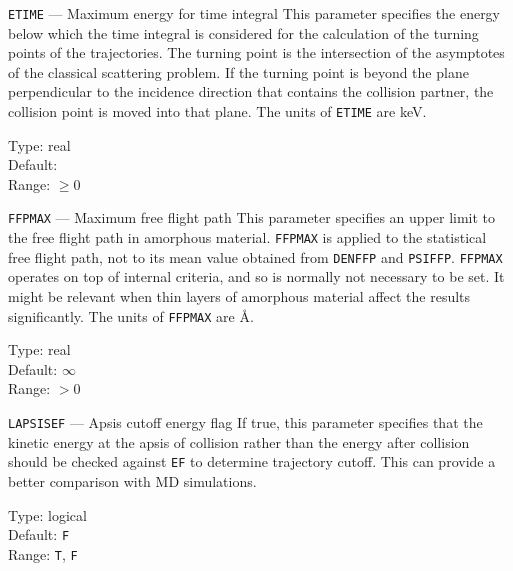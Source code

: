 \begin{keydescription}{\texttt{ETIME} --- Maximum energy for time integral}
%
  This parameter specifies the energy below which the time
  integral is considered for the calculation of the turning points of
  the trajectories. The turning point is the intersection of the asymptotes
  of the classical scattering problem. If the turning point is beyond the
  plane perpendicular to the incidence direction that contains the collision
  partner, the collision point is moved into that plane. The units of
  \texttt{ETIME} are keV.
  \begin{keytab}
    Type:    \> real \\
    Default:  \\
    Range:   \> $\ge 0$
  \end{keytab}
\end{keydescription}

\begin{keydescription}{\texttt{FFPMAX} --- Maximum free flight path}
%
  This parameter specifies an upper limit to the free flight path in amorphous
  material.  \texttt{FFPMAX} is applied to the statistical free flight path, not
  to its mean value obtained from \texttt{DENFFP} and \texttt{PSIFFP}. 
  \texttt{FFPMAX} operates on top of internal criteria, and so is normally not 
  necessary to be set. It might be relevant when thin layers of amorphous 
  material affect the results significantly. The units of \texttt{FFPMAX} are 
  \AA.
  \begin{keytab}
    Type:    \> real \\
    Default: \> $\infty$ \\
    Range:   \> $> 0$
  \end{keytab}
\end{keydescription}

\begin{keydescription}{\texttt{LAPSISEF} --- Apsis cutoff energy flag}
%
  If true, this parameter specifies that the kinetic energy at the apsis of 
  collision rather than the energy after collision should be checked against 
  \texttt{EF} to determine trajectory cutoff. This can provide a better
  comparison with MD simulations.
  \begin{keytab}
    Type:    \> logical \\
    Default: \> \texttt{F} \\
    Range:   \> \texttt{T}, \texttt{F}
  \end{keytab}
\end{keydescription}

